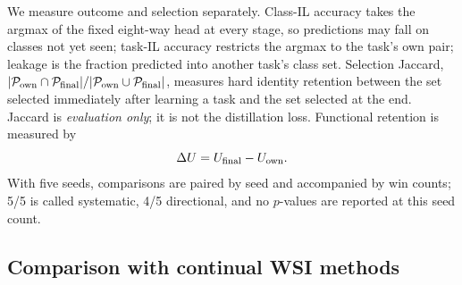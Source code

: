 \documentclass{article}
\newcommand{\Psel}{\mathcal{P}}
\begin{document}
We measure outcome and selection separately.
Class-IL accuracy takes the argmax of the fixed eight-way head at every stage, so predictions may fall on classes not yet seen; task-IL accuracy restricts the argmax to the task's own pair; leakage is the fraction predicted into another task's class set.
Selection Jaccard, $|\Psel_{\rm own}\cap\Psel_{\rm final}|/|\Psel_{\rm own}\cup\Psel_{\rm final}|$, measures hard identity retention between the set selected immediately after learning a task and the set selected at the end.
Jaccard is \emph{evaluation only}; it is not the distillation loss.
Functional retention is measured by
\[
\Delta U=U_{\rm final}-U_{\rm own}.
\]
With five seeds, comparisons are paired by seed and accompanied by win counts; 5/5 is called systematic, 4/5 directional, and no $p$-values are reported at this seed count.

\subsection{Comparison with continual WSI methods}
\label{ssec:sota}
\end{document}
